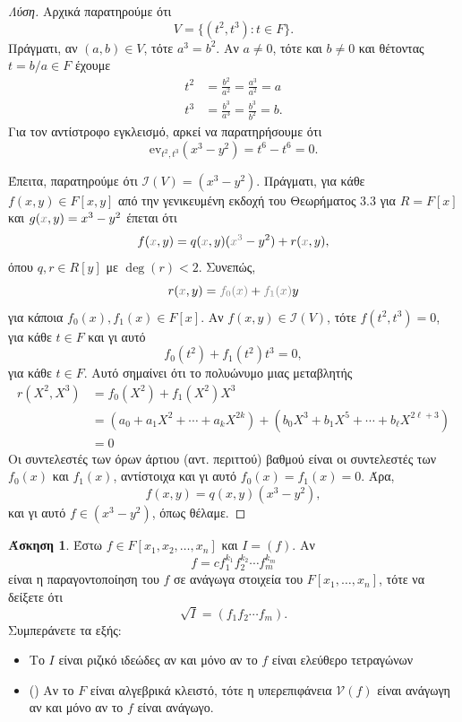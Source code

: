 \documentclass[12pt,a4paper,reqno]{amsart}
\makeatletter
\theoremstyle{definition}
\newtheorem{exercise}{Άσκηση}
\newcommand{\iI}{\mathcal{I}}
\newcommand{\vV}{\mathcal{V}}
\newcommand{\ev}{\mathrm{ev}}
\def\mathcolor#1#{\@mathcolor{#1}}
\def\@mathcolor#1#2#3{%
  \protect\leavevmode
  \begingroup
    \color#1{#2}#3%
  \endgroup
}
\makeatother
\begin{document}
\begin{proof}[Λύση]
  Αρχικά παρατηρούμε ότι 
  \[
  V = \{(t^2, t^3) : t \in F\}.
  \]
  Πράγματι, αν $(a, b) \in V$, τότε $a^3 = b^2$. Αν $a \neq 0$, τότε και $b \neq 0$ και θέτοντας $t = b/a \in F$ έχουμε
  \begin{align*}
    t^2 &= \frac{b^2}{a^2} = \frac{a^3}{a^2} = a \\
    t^3 &= \frac{b^3}{a^3} = \frac{b^3}{b^2} = b.
  \end{align*}
  Για τον αντίστροφο εγκλεισμό, αρκεί να παρατηρήσουμε ότι 
  \[
  \ev_{t^2, t^3}(x^3-y^2) = t^6 - t^6 = 0.
  \]

  Έπειτα, παρατηρούμε ότι $\iI(V) = (x^3-y^2)$. Πράγματι, για κάθε $f(x,y) \in F[x,y]$ από την γενικευμένη εκδοχή του Θεωρήματος 3.3 για $R = F[x]$ και $g(\mathcolor{gray}{x},y) = x^3-y^2$ έπεται ότι 
  \[
  f(\mathcolor{gray}{x},y) = q(\mathcolor{gray}{x},y)(\mathcolor{gray}{x^3}-y^2) + r(\mathcolor{gray}{x},y),
  \]
  όπου $q, r \in R[y]$ με $\deg(r) <2$. Συνεπώς,
  \[
  r(\mathcolor{gray}{x},y) = \mathcolor{gray}{f_0(x)} + \mathcolor{gray}{f_1(x)}y
  \]
  για κάποια $f_0(x), f_1(x) \in F[x]$. Αν $f(x,y) \in \iI(V)$, τότε $f(t^2,t^3) = 0$, για κάθε $t \in F$ και γι αυτό 
  \[
  f_0(t^2) + f_1(t^2)t^3 = 0,
  \]
  για κάθε $t \in F$. Αυτό σημαίνει ότι το πολυώνυμο μιας μεταβλητής 
  \begin{align*}
  r(X^2, X^3) 
  &= f_0(X^2) + f_1(X^2)X^3 \\
  &= \left(
    a_0 + a_1X^2 + \cdots + a_kX^{2k} 
  \right) + \left(
    b_0X^3 + b_1X^5 + \cdots + b_{\ell}X^{2\ell+3} 
  \right) \\
  &=0
  \end{align*}
  Οι συντελεστές των όρων άρτιου (αντ. περιττού) βαθμού είναι οι συντελεστές των $f_0(x)$ και $f_1(x)$, αντίστοιχα και γι αυτό $f_0(x) = f_1(x) = 0$. Άρα, 
  \[
  f(x,y) = q(x,y)(x^3-y^2),
  \]
  και γι αυτό $f \in (x^3-y^2)$, όπως θέλαμε.
\end{proof}

\begin{exercise}{\cite[Άσκηση~15.1.19]{DF04}}
  Έστω $f \in F[x_1, x_2, \dots, x_n]$ και $I = (f)$. Αν 
  \[
  f = c f_1^{k_1}f_2^{k_2}\cdots f_m^{k_m}
  \]
  είναι η παραγοντοποίηση του $f$ σε ανάγωγα στοιχεία του $F[x_1, \dots, x_n]$, τότε να δείξετε ότι 
  \[
  \sqrt{I} = \left(
    f_1f_2\cdots{f_m}
  \right).
  \]
  Συμπεράνετε τα εξής:
  \begin{itemize}
    \item Το $I$ είναι ριζικό ιδεώδες αν και μόνο αν το $f$ είναι ελεύθερο τετραγώνων
    \item (\cite[Άσκηση~15.2.15]{DF04}) Αν το $F$ είναι αλγεβρικά κλειστό, τότε η υπερεπιφάνεια $\vV(f)$ είναι ανάγωγη αν και μόνο αν το $f$ είναι ανάγωγο.
  \end{itemize}
\end{exercise}
\end{document}
